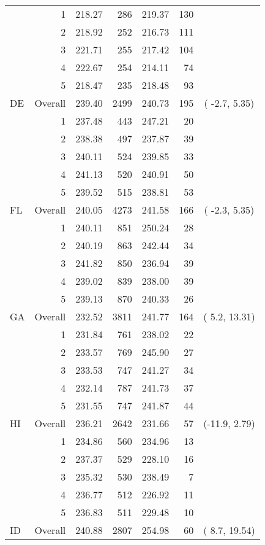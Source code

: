 \begin{longtable}{lrrr@{\extracolsep{.25cm}}rrc}
   & 1 & 218.27 & 286 & 219.37 & 130 &  \\ 
   & 2 & 218.92 & 252 & 216.73 & 111 &  \\ 
   & 3 & 221.71 & 255 & 217.42 & 104 &  \\ 
   & 4 & 222.67 & 254 & 214.11 &  74 &  \\ 
   & 5 & 218.47 & 235 & 218.48 &  93 &  \\ 
   \hline
DE & Overall & 239.40 & 2499 & 240.73 & 195 & ( -2.7,   5.35) \\ 
   & 1 & 237.48 & 443 & 247.21 &  20 &  \\ 
   & 2 & 238.38 & 497 & 237.87 &  39 &  \\ 
   & 3 & 240.11 & 524 & 239.85 &  33 &  \\ 
   & 4 & 241.13 & 520 & 240.91 &  50 &  \\ 
   & 5 & 239.52 & 515 & 238.81 &  53 &  \\ 
   \hline
FL & Overall & 240.05 & 4273 & 241.58 & 166 & ( -2.3,   5.35) \\ 
   & 1 & 240.11 & 851 & 250.24 &  28 &  \\ 
   & 2 & 240.19 & 863 & 242.44 &  34 &  \\ 
   & 3 & 241.82 & 850 & 236.94 &  39 &  \\ 
   & 4 & 239.02 & 839 & 238.00 &  39 &  \\ 
   & 5 & 239.13 & 870 & 240.33 &  26 &  \\ 
   \hline
GA & Overall & 232.52 & 3811 & 241.77 & 164 & (  5.2,  13.31) \\ 
   & 1 & 231.84 & 761 & 238.02 &  22 &  \\ 
   & 2 & 233.57 & 769 & 245.90 &  27 &  \\ 
   & 3 & 233.53 & 747 & 241.27 &  34 &  \\ 
   & 4 & 232.14 & 787 & 241.73 &  37 &  \\ 
   & 5 & 231.55 & 747 & 241.87 &  44 &  \\ 
   \hline
HI & Overall & 236.21 & 2642 & 231.66 &  57 & (-11.9,   2.79) \\ 
   & 1 & 234.86 & 560 & 234.96 &  13 &  \\ 
   & 2 & 237.37 & 529 & 228.10 &  16 &  \\ 
   & 3 & 235.32 & 530 & 238.49 &   7 &  \\ 
   & 4 & 236.77 & 512 & 226.92 &  11 &  \\ 
   & 5 & 236.83 & 511 & 229.48 &  10 &  \\ 
   \hline
ID & Overall & 240.88 & 2807 & 254.98 &  60 & (  8.7,  19.54) \\ 

\end{longtable}
